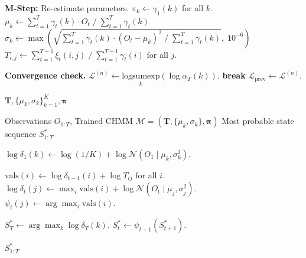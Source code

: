 \begin{algorithm}[tp]
\begin{algorithmic}[1]
    \STATE \textbf{M-Step:} Re-estimate parameters.
    \STATE $\pi_k \leftarrow \gamma_1(k)$ for all $k$.
        \STATE $\mu_k \leftarrow \sum_{t=1}^T \gamma_t(k) \cdot O_t \;/\; \sum_{t=1}^T \gamma_t(k)$
        \STATE $\sigma_k \leftarrow \max\!\left(\sqrt{\sum_{t=1}^T \gamma_t(k) \cdot (O_t - \mu_k)^2 \;/\; \sum_{t=1}^T \gamma_t(k)},\; 10^{-6}\right)$
    \ENDFOR
        \STATE $T_{i,j} \leftarrow \sum_{t=1}^{T-1} \xi_t(i,j) \;/\; \sum_{t=1}^{T-1} \gamma_t(i)$ for all $j$.
    \ENDFOR

    \STATE \textbf{Convergence check.}
    \STATE $\mathcal{L}^{(n)} \leftarrow \underset{k}{\text{logsumexp}}(\log \alpha_T(k))$.
        \STATE \textbf{break}
    \ENDIF
    \STATE $\mathcal{L}_{\text{prev}} \leftarrow \mathcal{L}^{(n)}$.
\ENDFOR

\RETURN $\mathbf{T}, \{\mu_k, \sigma_k\}_{k=1}^K, \boldsymbol{\pi}$
\end{algorithmic}
\end{algorithm}

\begin{algorithm}[tp]
\caption{Viterbi decoding for the most likely hidden state sequence}
\label{alg:viterbi}
\small
\begin{algorithmic}[1]
\REQUIRE Observations $O_{1:T}$, Trained CHMM $\mathcal{M} = (\mathbf{T}, \{\mu_k, \sigma_k\}, \boldsymbol{\pi})$
\ENSURE Most probable state sequence $S_{1:T}^*$

    \STATE $\log \delta_1(k) \leftarrow \log(1/K) + \log \mathcal{N}(O_1 \mid \mu_k, \sigma_k^2)$.
\ENDFOR

        \STATE $\text{vals}(i) \leftarrow \log \delta_{t-1}(i) + \log T_{ij}$ for all $i$.
        \STATE $\log \delta_t(j) \leftarrow \max_i \text{vals}(i) + \log \mathcal{N}(O_t \mid \mu_j, \sigma_j^2)$.
        \STATE $\psi_t(j) \leftarrow \arg\max_i \text{vals}(i)$.
    \ENDFOR
\ENDFOR

\STATE $S_T^* \leftarrow \arg\max_k \log \delta_T(k)$.
    \STATE $S_t^* \leftarrow \psi_{t+1}(S_{t+1}^*)$.
\ENDFOR

\RETURN $S_{1:T}^*$
\end{algorithmic}
\end{algorithm}

